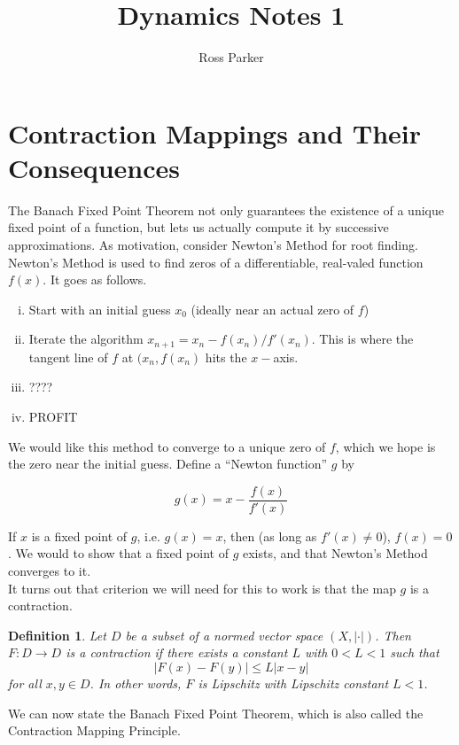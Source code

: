 \documentclass{article}
\title{Dynamics Notes 1}
\author{Ross Parker}
\newtheorem{definition}{Definition}[section]
\begin{document}
\section{Contraction Mappings and Their Consequences}

The Banach Fixed Point Theorem not only guarantees the existence of a unique fixed point of a function, but lets us actually compute it by successive approximations. As motivation, consider Newton's Method for root finding.\\

Newton's Method is used to find zeros of a differentiable, real-valed function $f(x)$. It goes as follows.

\begin{enumerate}[(i)]
\item Start with an initial guess $x_0$ (ideally near an actual zero of $f$)
\item Iterate the algorithm $x_{n+1} = x_n - f(x_n)/f'(x_n)$. This is where the tangent line of $f$ at $(x_n, f(x_n)$ hits the $x-$axis.
\item ????
\item PROFIT
\end{enumerate}

We would like this method to converge to a unique zero of $f$, which we hope is the zero near the initial guess. Define a ``Newton function'' $g$ by

\[
g(x) = x - \frac{f(x)}{f'(x)}
\]

If $x$ is a fixed point of $g$, i.e. $g(x) = x$, then (as long as $f'(x) \neq 0$), $f(x) = 0$. We would to show that a fixed point of $g$ exists, and that Newton's Method converges to it. \\

It turns out that criterion we will need for this to work is that the map $g$ is a contraction.\\

\begin{definition}Let $D$ be a subset of a normed vector space $(X, |\cdot|)$. Then $F: D \rightarrow D$ is a \emph{contraction} if there exists a constant $L$ with $0 < L < 1$ such that 
\[
|F(x) - F(y)| \leq L |x - y|
\]
for all $x, y \in D$. In other words, $F$ is Lipschitz with Lipschitz constant $L < 1$.
\end{definition}

We can now state the Banach Fixed Point Theorem, which is also called the Contraction Mapping Principle.\\
\end{document}
